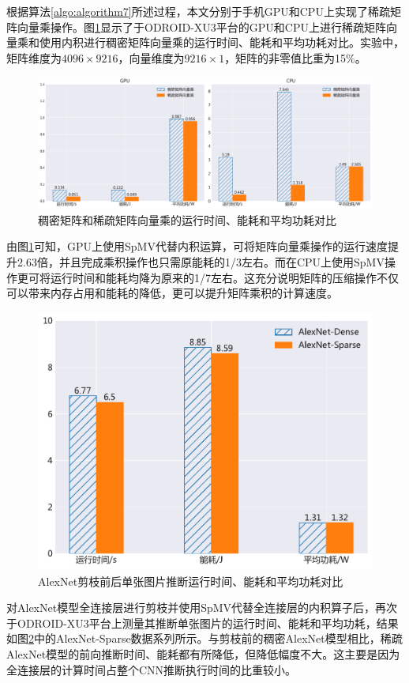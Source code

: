 根据算法\ref{algo:algorithm7}所述过程，本文分别于手机GPU和CPU上实现了稀疏矩阵向量乘操作。图\ref{figure:figure25}显示了于ODROID-XU3平台的GPU和CPU上进行稀疏矩阵向量乘和使用内积进行稠密矩阵向量乘的运行时间、能耗和平均功耗对比。实验中，矩阵维度为$4096 \times 9216$，向量维度为$9216 \times 1$，矩阵的非零值比重为15\%。

\begin{figure}[htbp]
    \centering
    \includegraphics[width=1.0\textwidth]{figures/spmv.pdf}
    \caption{稠密矩阵和稀疏矩阵向量乘的运行时间、能耗和平均功耗对比}\label{figure:figure25}
\end{figure}

由图\ref{figure:figure25}可知，GPU上使用SpMV代替内积运算，可将矩阵向量乘操作的运行速度提升2.63倍，并且完成乘积操作也只需原能耗的1/3左右。而在CPU上使用SpMV操作更可将运行时间和能耗均降为原来的1/7左右。这充分说明矩阵的压缩操作不仅可以带来内存占用和能耗的降低，更可以提升矩阵乘积的计算速度。


\begin{figure}[htbp]
    \centering
    \includegraphics[height=0.4\textwidth]{figures/alexnet_sparse.pdf}
    \caption{AlexNet剪枝前后单张图片推断运行时间、能耗和平均功耗对比}\label{figure:figure26}
\end{figure}

对AlexNet模型全连接层进行剪枝并使用SpMV代替全连接层的内积算子后，再次于ODROID-XU3平台上测量其推断单张图片的运行时间、能耗和平均功耗，结果如图\ref{figure:figure26}中的AlexNet-Sparse数据系列所示。与剪枝前的稠密AlexNet模型相比，稀疏AlexNet模型的前向推断时间、能耗都有所降低，但降低幅度不大。这主要是因为全连接层的计算时间占整个CNN推断执行时间的比重较小。

